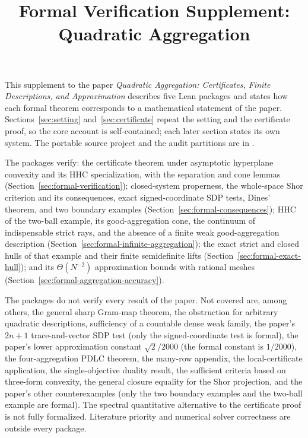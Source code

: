 \documentclass[11pt]{article}
\title{Formal Verification Supplement:\\Quadratic Aggregation}
\author{}
\date{}
\begin{document}
\maketitle
This supplement to the paper \emph{Quadratic Aggregation: Certificates,
Finite Descriptions, and Approximation} describes five Lean packages and
states how each formal theorem corresponds to a mathematical statement of
the paper. Sections~\ref{sec:setting} and~\ref{sec:certificate} repeat
the setting and the certificate proof, so the core account is
self-contained; each later section states its own system. The portable
source project and the audit partitions are in .

The packages verify: the certificate theorem under asymptotic hyperplane
convexity and its HHC specialization, with the separation and cone lemmas
(Section~\ref{sec:formal-verification}); closed-system properness, the
whole-space Shor criterion and its consequences, exact
signed-coordinate SDP tests, Dines'
theorem, and two boundary examples (Section~\ref{sec:formal-consequences});
HHC of the two-ball example, its good-aggregation cone, the continuum of
indispensable strict rays, and the absence of a finite weak
good-aggregation description (Section~\ref{sec:formal-infinite-aggregation});
the exact strict and closed hulls of that example and their finite
semidefinite lifts (Section~\ref{sec:formal-exact-hull}); and its
$\Theta(N^{-2})$ approximation bounds with rational meshes
(Section~\ref{sec:formal-aggregation-accuracy}).

The packages do not verify every result of the paper. Not covered are,
among others, the general sharp Gram-map theorem, the obstruction for arbitrary quadratic
descriptions, sufficiency of a countable dense weak family, the paper's
$2n+1$ trace-and-vector SDP test (only the signed-coordinate test is
formal), the paper's lower approximation constant $\sqrt2/2000$ (the
formal constant is $1/2000$), the four-aggregation PDLC theorem, the
many-row appendix, the local-certificate application, the
single-objective duality result, the sufficient criteria based on
three-form convexity, the general closure equality for the Shor
projection, and the paper's other counterexamples (only the two
boundary examples and the two-ball example are formal). The spectral
quantitative alternative to the certificate proof is not fully
formalized. Literature priority and numerical solver correctness are
outside every package.
\tableofcontents









\end{document}
